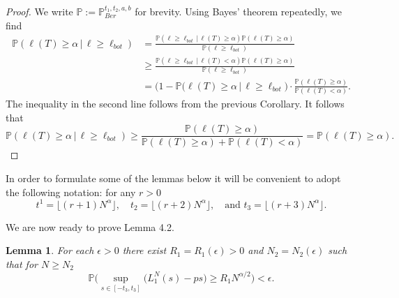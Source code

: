 \documentclass[12pt]{article}
\newtheorem{lemma}{Lemma}
\begin{document}
	\begin{proof}
		We write $\mathbb{P} := \mathbb{P}^{t_1,t_2,a,b}_{Ber}$ for brevity. Using Bayes' theorem repeatedly, we find
		\begin{align*}
		\mathbb{P}(\ell(T)\geq\alpha\,|\,\ell \geq \ell_{bot}) &= \frac{\mathbb{P}(\ell \geq \ell_{bot}\,|\,\ell(T)\geq\alpha) \mathbb{P}(\ell(T)\geq\alpha)}{\mathbb{P}(\ell \geq \ell_{bot})}\\ 
		&\geq \frac{\mathbb{P}(\ell \geq \ell_{bot}\,|\,\ell(T) < \alpha) \mathbb{P}(\ell(T)\geq\alpha)}{\mathbb{P}(\ell \geq \ell_{bot})}\\
		&= \big(1 - \mathbb{P}(\ell(T)\geq\alpha\,|\,\ell \geq \ell_{bot}\big)\cdot\frac{\mathbb{P}(\ell(T)\geq\alpha)}{\mathbb{P}(\ell(T) < \alpha)}.
		\end{align*}
		The inequality in the second line follows from the previous Corollary. It follows that
		\[
		\mathbb{P}(\ell(T)\geq\alpha\,|\,\ell \geq \ell_{bot}) \geq \frac{\mathbb{P}(\ell(T)\geq\alpha)}{\mathbb{P}(\ell(T)\geq\alpha) + \mathbb{P}(\ell(T) < \alpha)} = \mathbb{P}(\ell(T)\geq\alpha).
		\]
	\end{proof}

	In order to formulate some of the lemmas below it will be convenient to adopt the following notation: for any $r > 0$
	\begin{equation*}\label{eqsts}
	t^1 =\lfloor (r+1) N^{\alpha} \rfloor,\quad t_2 = \lfloor (r+2)N^{\alpha} \rfloor,\quad \textrm{and } t_3 = \lfloor (r+3)N^{\alpha} \rfloor.
	\end{equation*}
	
	We are now ready to prove Lemma 4.2.

	\begin{lemma}
		For each $\epsilon > 0$ there exist $R_1=R_1(\epsilon) > 0$ and $N_2= N_2(\epsilon)$ such that for $N \geq N_2$ 
		$$\mathbb{P}\Big( \sup_{s \in [ -t_3, t_3] }\big( L^N_1(s) - p s \big) \geq  R_1N^{\alpha/2} \Big) < \epsilon.$$
	\end{lemma}
\end{document}
